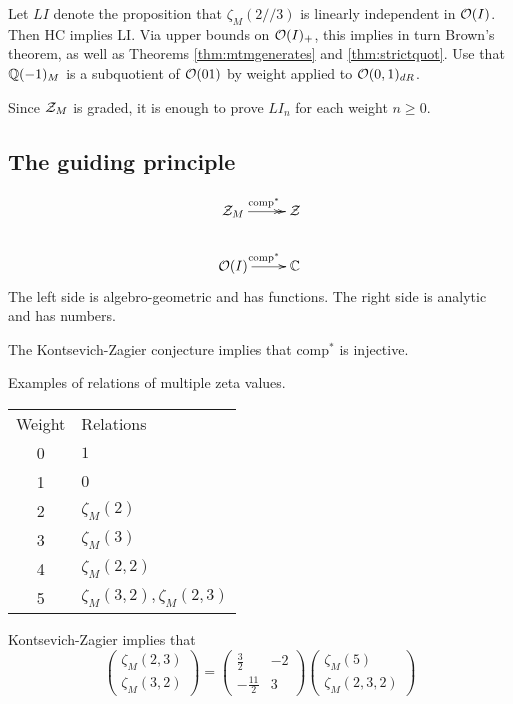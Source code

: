\begin{rem}
Let $LI$ denote the proposition that $\zeta_M(2//3)$ is linearly independent in $\mathcal{O}(I)$.
Then HC implies LI. Via upper bounds on $\mathcal{O}(I)_+$, this implies in turn Brown's theorem, as well as Theorems \ref{thm:mtmgenerates} and \ref{thm:strictquot}. Use that $\mathbb{Q}(-1)_M$ is a subquotient of $\mathcal{O}(01)$ by weight applied to $\mathcal{O}(0,1)_{dR}$.

Since $\mathcal{Z}_M$ is graded, it is enough to prove $LI_n$ for each weight $n \geq 0$.
\end{rem}

\subsection{The guiding principle}
\[
\xymatrix{
\cZ_M \ar@{->>}[r]^{\mathrm{comp}^*} & \cZ \\
\cO(I) \ar[r]^{\mathrm{comp}^*} & \C
}
\]
The left side is algebro-geometric and has functions. The right side is analytic and has numbers.

The Kontsevich-Zagier conjecture implies that $\textrm{comp}^*$ is injective.

Examples of relations of multiple zeta values.
\begin{center}
\begin{tabular}{cl}
Weight & Relations \\
0 & $1$ \\
1 & $0$ \\
2 & $\zeta_M(2)$ \\
3 & $\zeta_M(3)$ \\
4 & $\zeta_M(2,2)$ \\
5 & $\zeta_M(3,2), \zeta_M(2,3)$
\end{tabular}
\end{center}

Kontsevich-Zagier implies that
\[\label{eq:KZ1}
\left( \begin{array}{c}
\zeta_M(2,3) \\
\zeta_M(3,2)
\end{array} \right)
=
\left( \begin{array}{cc}
\frac{3}{2} & -2 \\
-\frac{11}{2} & 3
\end{array} \right)
\left( \begin{array}{c}
\zeta_M(5) \\
\zeta_M(2,3,2)
\end{array} \right)
\]

